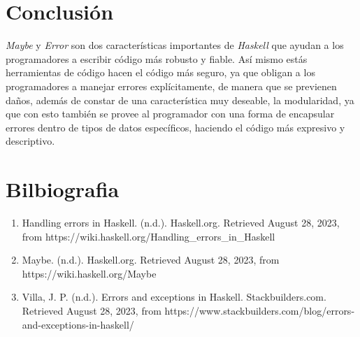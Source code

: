 \documentclass{dense_template}
\begin{document}
\section{Conclusión}
\textit{Maybe} y \textit{Error} son dos características importantes de \textit{Haskell} que ayudan a los programadores a escribir código más robusto y fiable. Así mismo estás herramientas de código hacen el código más seguro, ya que obligan a los programadores a manejar errores explícitamente, de manera que se previenen daños, además de constar de una característica muy deseable, la modularidad, ya que con esto también se provee al programador con una forma de encapsular errores dentro de tipos de datos específicos, haciendo el código más expresivo y descriptivo.
\pagebreak
\section{Bilbiografia}
\sloppy
\begin{enumerate}
    \item Handling errors in Haskell. (n.d.). Haskell.org. Retrieved August 28, 2023, from https://wiki.haskell.org/Handling\_errors\_in\_Haskell
    \item Maybe. (n.d.). Haskell.org. Retrieved August 28, 2023, from https://wiki.haskell.org/Maybe
    \item Villa, J. P. (n.d.). Errors and exceptions in Haskell. Stackbuilders.com. Retrieved August 28, 2023, from https://www.stackbuilders.com/blog/errors-and-exceptions-in-haskell/
\end{enumerate}
\end{document}
